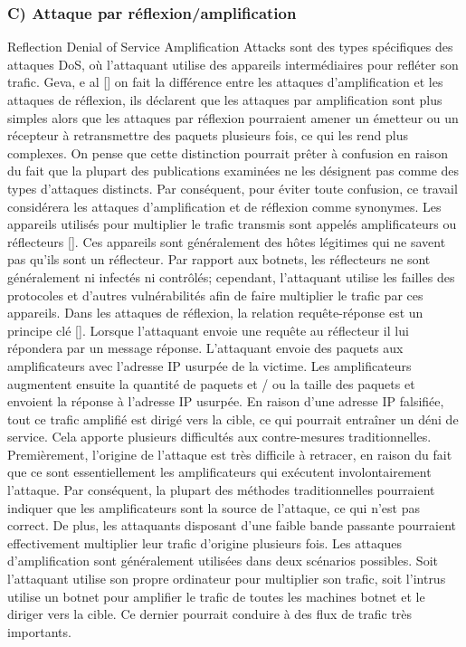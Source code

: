 \subsubsection{C) Attaque par réflexion/amplification}
\label{rDoS}
Reflection Denial of Service Amplification Attacks sont des types spécifiques des attaques DoS, où l'attaquant utilise des appareils intermédiaires pour refléter son trafic. Geva, e al [\cite{8}] on fait la différence entre les attaques d'amplification et les attaques de réflexion, ils déclarent que les attaques par amplification sont plus simples alors que les attaques par réflexion pourraient amener un émetteur ou un récepteur à retransmettre des paquets plusieurs fois, ce qui les rend plus complexes. On pense que cette distinction pourrait prêter à confusion en raison du fait que la plupart des publications examinées ne les désignent pas comme des types d'attaques distincts. Par conséquent, pour éviter toute confusion, ce travail considérera les attaques d'amplification et de réflexion comme synonymes. Les appareils utilisés pour multiplier le trafic transmis sont appelés amplificateurs ou réflecteurs [\cite{9}]. Ces appareils sont généralement des hôtes légitimes qui ne savent pas qu'ils sont un réflecteur. Par rapport aux botnets, les réflecteurs ne sont généralement ni infectés ni contrôlés; cependant, l'attaquant utilise les failles des protocoles et d'autres vulnérabilités afin de faire multiplier le trafic par ces appareils. Dans les attaques de réflexion, la relation requête-réponse est un principe clé [\cite{10}]. Lorsque l'attaquant envoie une requête au réflecteur il lui répondera par un message réponse. L'attaquant envoie des paquets aux amplificateurs avec l'adresse IP usurpée de la victime. Les amplificateurs augmentent ensuite la quantité de paquets et / ou la taille des paquets et envoient la réponse à l'adresse IP usurpée. En raison d'une adresse IP falsifiée, tout ce trafic amplifié est dirigé vers la cible, ce qui pourrait entraîner un déni de service. Cela apporte plusieurs difficultés aux contre-mesures traditionnelles. Premièrement, l'origine de l'attaque est très difficile à retracer, en raison du fait que ce sont essentiellement les amplificateurs qui exécutent involontairement l'attaque. Par conséquent, la plupart des méthodes traditionnelles pourraient indiquer que les amplificateurs sont la source de l'attaque, ce qui n'est pas correct. De plus, les attaquants disposant d'une faible bande passante pourraient effectivement multiplier leur trafic d'origine plusieurs fois. Les attaques d'amplification sont généralement utilisées dans deux scénarios possibles. Soit l'attaquant utilise son propre ordinateur pour multiplier son trafic, soit l'intrus utilise un botnet pour amplifier le trafic de toutes les machines botnet et le diriger vers la cible. Ce dernier pourrait conduire à des flux de trafic très importants.

